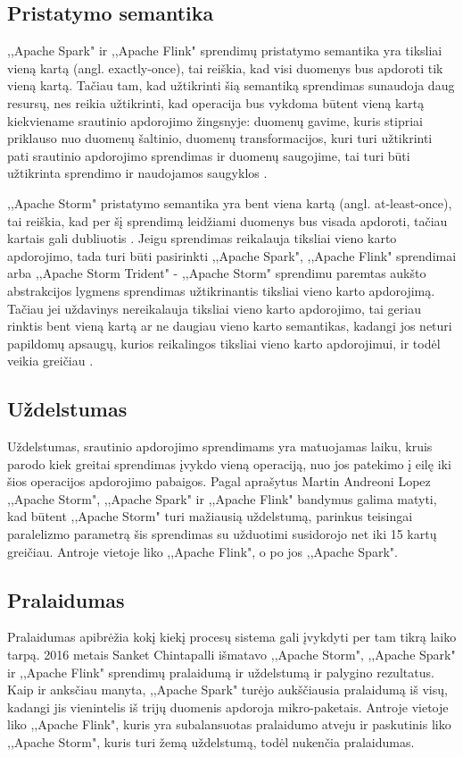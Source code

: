 \documentclass{VUMIFPSkursinis}
\begin{document}
\subsection{Pristatymo semantika}
,,Apache Spark" ir ,,Apache Flink" sprendimų pristatymo semantika yra tiksliai vieną kartą (angl. exactly-once), tai reiškia, kad visi 
duomenys bus apdoroti tik vieną kartą. Tačiau tam, kad užtikrinti šią semantiką sprendimas sunaudoja daug resursų, nes reikia užtikrinti, kad 
operacija bus vykdoma būtent vieną kartą kiekviename srautinio apdorojimo žingsnyje: duomenų gavime, kuris stipriai priklauso nuo duomenų šaltinio,
duomenų transformacijos, kuri turi užtikrinti pati srautinio apdorojimo sprendimas ir duomenų saugojime, tai turi būti užtikrinta sprendimo ir
naudojamos saugyklos \cite{zhang20}.\par
    ,,Apache Storm" pristatymo semantika yra bent viena kartą (angl. at-least-once), tai reiškia, kad per šį sprendimą leidžiami duomenys 
bus visada apdoroti, tačiau kartais gali dubliuotis \cite{prithi20}. Jeigu sprendimas reikalauja tiksliai vieno karto apdorojimo, tada turi būti pasirinkti
,,Apache Spark", ,,Apache Flink" sprendimai arba ,,Apache Storm Trident" - ,,Apache Storm" sprendimu paremtas aukšto abstrakcijos lygmens sprendimas 
užtikrinantis tiksliai vieno karto apdorojimą. Tačiau jei uždavinys nereikalauja tiksliai vieno karto apdorojimo, tai geriau
rinktis bent vieną kartą ar ne daugiau vieno karto semantikas, kadangi jos neturi papildomų apsaugų, kurios reikalingos tiksliai vieno karto apdorojimui,
ir todėl veikia greičiau \cite{zhang20}.
\subsection{Uždelstumas}
    Uždelstumas, srautinio apdorojimo sprendimams yra matuojamas laiku, kruis parodo kiek greitai sprendimas įvykdo vieną operaciją, nuo jos patekimo į eilę iki šios operacijos
    apdorojimo pabaigos. 
Pagal \cite{Lopez2016APC} aprašytus Martin Andreoni Lopez ,,Apache Storm", ,,Apache Spark" ir ,,Apache Flink" bandymus galima matyti, kad būtent ,,Apache Storm" turi mažiausią uždelstumą,
parinkus teisingai paralelizmo parametrą šis sprendimas su užduotimi susidorojo net iki 15 kartų greičiau. Antroje vietoje liko ,,Apache Flink", o po jos
,,Apache Spark".

\subsection{Pralaidumas}
Pralaidumas apibrėžia kokį kiekį procesų sistema gali įvykdyti per tam tikrą laiko tarpą. 2016 metais Sanket Chintapalli \cite{chintapalli2016benchmarking} išmatavo ,,Apache Storm",
,,Apache Spark" ir ,,Apache Flink" sprendimų pralaidumą ir uždelstumą ir palygino rezultatus. Kaip ir anksčiau manyta, ,,Apache Spark" turėjo aukščiausia 
pralaidumą iš visų, kadangi jis vienintelis iš trijų duomenis apdoroja mikro-paketais. Antroje vietoje liko ,,Apache Flink", kuris yra subalansuotas
pralaidumo atveju ir paskutinis liko ,,Apache Storm", kuris turi žemą uždelstumą, todėl nukenčia pralaidumas.
\end{document}
